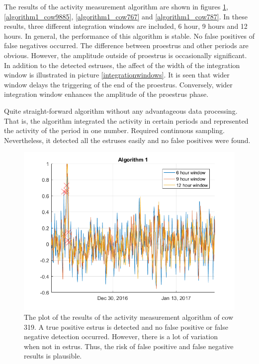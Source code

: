 \documentclass[english,12pt,a4paper,pdftex,elec,utf8]{aaltothesis}
\begin{document}
The results of the activity measurement algorithm are shown in figures \ref{algorithm1_cow319}, \ref{algorithm1_cow9885}, \ref{algorithm1_cow767} and \ref{algorithm1_cow787}. In these results, three different integration windows are included, 6 hour, 9 hours and 12 hours. In general, the performance of this algorithm is stable. No false positives of false negatives occurred. The difference between proestrus and other periods are obvious. However, the amplitude outside of proestrus is occasionally significant. In addition to the detected estruses, the affect of the width of the integration window is illustrated in picture \ref{integrationwindows}. It is seen that wider window delays the triggering of the end of the proestrus. Conversely, wider integration window enhances the amplitude of the proestrus phase. 



Quite straight-forward algorithm without any advantageous data processing. That is, the algorithm integrated the activity in certain periods and represented the activity of the period in one number. Required continuous sampling. Nevertheless, it detected all the estruses easily and no false positives were found. \\

\begin{figure}[htb]
\centering
\includegraphics[width = 0.75 \textwidth]{figures/algorithm1_cow319}
\caption{The plot of the results of the activity measurement algorithm of cow 319. A true positive estrus is detected and no false positive or false negative detection occurred. However, there is a lot of variation when not in estrus. Thus, the risk of false positive and false negative results is plausible.}
\label{algorithm1_cow319}
\end{figure}
\end{document}
